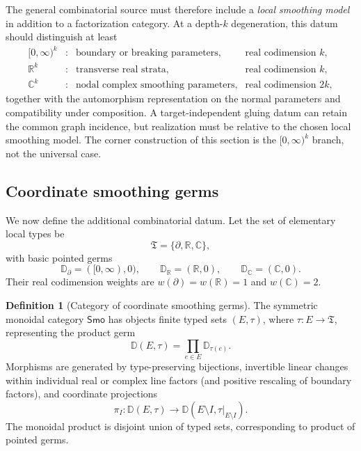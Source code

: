 \documentclass[11pt,letterpaper,twoside]{article}
\theoremstyle{plain}
\theoremstyle{definition}
\newtheorem{definition}[theorem]{Definition}
\theoremstyle{remark}
\newcommand{\Smo}{\mathsf{Smo}}
\begin{document}
The general combinatorial source must therefore include a \emph{local smoothing model} in addition to a factorization category.  At a depth-\(k\) degeneration, this datum should distinguish at least
\begin{equation}\label{eq:local-models}
 \begin{array}{rcll}
 [0,\infty)^k &:& \text{boundary or breaking parameters},
 &\text{real codimension }k,\\
 \mathbb R^k &:& \text{transverse real strata},
 &\text{real codimension }k,\\
 \mathbb C^k &:& \text{nodal complex smoothing parameters},
 &\text{real codimension }2k,
 \end{array}
\end{equation}
together with the automorphism representation on the normal parameters and compatibility under composition.  A target-independent gluing datum can retain the common graph incidence, but realization must be relative to the chosen local smoothing model.  The corner construction of this section is the \([0,\infty)^k\) branch, not the universal case.

\subsection{Coordinate smoothing germs}

We now define the additional combinatorial datum.  Let the set of elementary local types be
\[
 \mathfrak T=\{\partial,\mathbb R,\mathbb C\},
\]
with basic pointed germs
\begin{equation}\label{eq:basic-germs}
 \mathbb D_\partial=([0,\infty),0),\qquad
 \mathbb D_{\mathbb R}=(\mathbb R,0),\qquad
 \mathbb D_{\mathbb C}=(\mathbb C,0).
\end{equation}
Their real codimension weights are \(w(\partial)=w(\mathbb R)=1\) and \(w(\mathbb C)=2\).

\begin{definition}[Category of coordinate smoothing germs]\label{def:smo-category}
The symmetric monoidal category \(\Smo\) has objects finite typed sets \((E,\tau)\), where \(\tau:E\to\mathfrak T\), representing the product germ
\begin{equation}\label{eq:smoothing-product}
 \mathbb D(E,\tau)=\prod_{e\in E}\mathbb D_{\tau(e)}.
\end{equation}
Morphisms are generated by type-preserving bijections, invertible linear changes within individual real or complex line factors (and positive rescaling of boundary factors), and coordinate projections
\[
 \pi_I:\mathbb D(E,\tau)\longrightarrow
 \mathbb D(E\setminus I,\tau|_{E\setminus I}).
\]
The monoidal product is disjoint union of typed sets, corresponding to product of pointed germs.
\end{definition}
\end{document}
